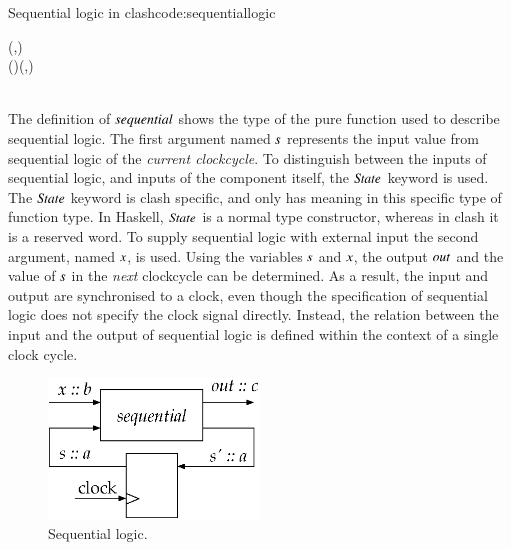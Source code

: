 \begin{texexptitled}{Sequential logic in \gls{clash}}{code:sequentiallogic}\begin{hscode}\SaveRestoreHook
{}%
%
%
%
%
%
\>[3]{}\mathbin{::}\;\to {}\to (\;,){}\<[E]%
\\
\>[3]{}\;(\;)\;\mathrel{=}(\;,){}\<[E]%
\\
\>[3]{}\<[5]%
\>[5]{}\;{}\<[13]%
\>[13]{}\<[19]%
\>[19]{}\mathrel{=}\<[E]%
\\
\>[13]{}\<[19]%
\>[19]{}\mathrel{=}\<[E]%
\ColumnHook
\end{hscode}\resethooks
\end{texexptitled}

The definition of \ensuremath{\Varid{sequential}} shows the type of the pure function used to describe sequential logic.
The first argument named \ensuremath{\Varid{s}} represents the input value from sequential logic of the \textit{current clockcycle}.
To distinguish between the inputs of sequential logic, and inputs of the component itself, the \ensuremath{\Conid{State}} keyword is used. 
The \ensuremath{\Conid{State}} keyword is \gls{clash} specific, and only has meaning in this specific type of function type.
In Haskell, \ensuremath{\Conid{State}} is a normal type constructor, whereas in \gls{clash} it is a reserved word.
To supply sequential logic with external input the second argument, named \ensuremath{\Varid{x}}, is used.
Using the variables \ensuremath{\Varid{s}} and \ensuremath{\Varid{x}}, the output \ensuremath{\Varid{out}} and the value of \ensuremath{\Varid{s}} in the \textit{next} clockcycle can be determined.
As a result, the input and output are synchronised to a clock, even though the specification of sequential logic does not specify the clock signal directly.
Instead, the relation between the input and the output of sequential logic is defined within the context of a single clock cycle.

\begin{figure}[H]
\begin{center}
\centering
\includegraphics[width=0.5\textwidth]{images/sequential}
\end{center}
\caption{Sequential logic.} \label{fig:sequential}
\end{figure}

